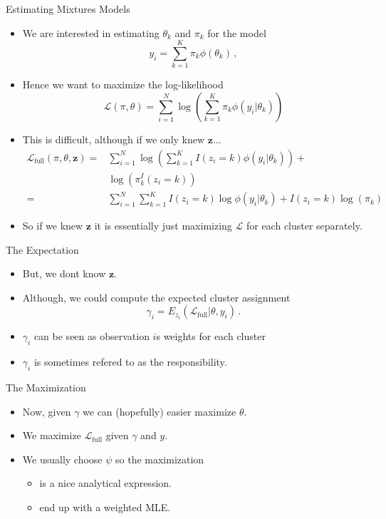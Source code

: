 \documentclass[10pt]{beamer}
\begin{document}
\begin{frame}{Estimating Mixtures Models}

\begin{itemize}
\item We are interested in estimating $\theta_k$ and $\pi_k$ for the model
\[
y_i = \sum_{k=1}^K \pi_k \phi(\theta_k)\,,
\]
\item Hence we want to maximize the log-likelihood
\[
\mathcal{L}(\pi, \theta) = \sum^N_{i=1} \log \left( \sum_{k=1}^K \pi_k \phi(y_i|\theta_k)\right)
\]
\item This is difficult, although {\color{uured} if we only knew $\mathbf{z}$}...\pause
\begin{align*}
\mathcal{L}_{\text{full}}(\pi, \theta, \mathbf{z}) =& \sum^N_{i=1} \log \left( \sum_{k=1}^K I(z_i=k) \phi(y_i|\theta_k)\right) + \\
& \log(\pi_k^I(z_i=k))\\
=& \sum^N_{i=1} \sum_{k=1}^K I(z_i=k) \log \phi(y_i|\theta_k) + I(z_i=k) \log(\pi_k)
\end{align*}
\item So if we knew $\mathbf{z}$ it is essentially just maximizing $\mathcal{L}$ for each cluster separately.

\end{itemize}

\end{frame}


\begin{frame}{The Expectation}

\begin{itemize}
\item But, we dont know $\mathbf{z}$.\pause
\item Although, we could compute the {\color{uured} expected} cluster assignment
\[
\gamma_{i} = E_{z_i} (\mathcal{L}_{\text{full}}|\theta, y_i)\,.
\]
\item $\gamma_{i}$ can be seen as observation $i$s {\color{uured} weights} for each cluster
\item $\gamma_{i}$ is sometimes refered to as the {\color{uured} responsibility}.
\end{itemize}

\end{frame}


\begin{frame}{The Maximization}

\begin{itemize}
\item Now, given $\gamma$ we can (hopefully) easier maximize $\theta$.\pause
\item We maximize $\mathcal{L}_{\text{full}}$ given $\gamma$ and $y$.\pause
\item We usually choose $\psi$ so the maximization
\begin{itemize}
\item is a nice analytical expression.
\item end up with a weighted MLE.
\end{itemize}

\end{itemize}



\end{frame}
\end{document}
